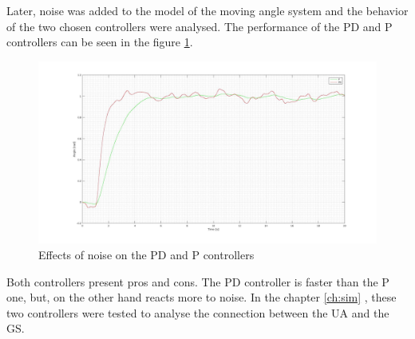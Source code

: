 Later, noise was added to the model of the moving angle system and the behavior of the two chosen controllers were analysed. The performance of the PD and P controllers can be seen in the figure \ref{fig:noise_PID}.

\begin{figure}[H]
\centering
\includegraphics[scale=0.2]{figures/comp_PDP.jpg}
\caption{Effects of noise on the PD and P controllers}
\label{fig:noise_PID}
\end{figure}

Both controllers present pros and cons. The PD controller is faster than the P one, but, on the other hand reacts more to noise. In the chapter \ref{ch:sim} , these two controllers were tested to analyse the connection between the UA and the GS.
